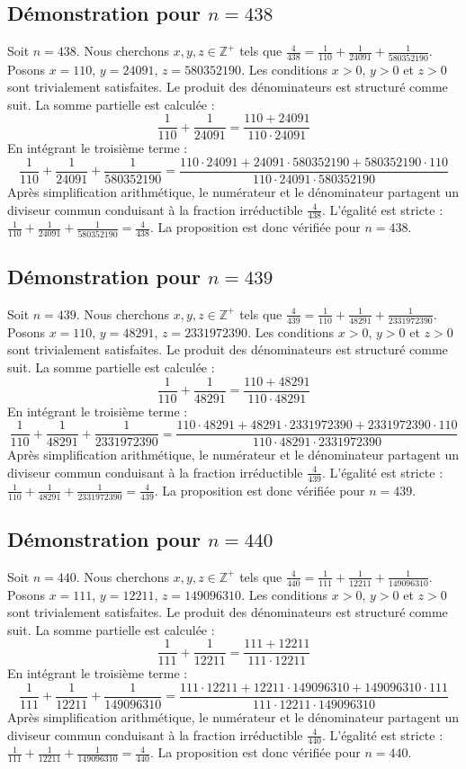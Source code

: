 \documentclass[11pt,a4paper]{article}
\begin{document}
\subsection{Démonstration pour $n = 438$}
Soit $n = 438$. Nous cherchons $x, y, z \in \mathbb{Z}^{+}$ tels que $\frac{4}{438} = \frac{1}{110} + \frac{1}{24091} + \frac{1}{580352190}$.
Posons $x = 110$, $y = 24091$, $z = 580352190$.
Les conditions $x > 0$, $y > 0$ et $z > 0$ sont trivialement satisfaites.
Le produit des dénominateurs est structuré comme suit. La somme partielle est calculée :
$$ \frac{1}{110} + \frac{1}{24091} = \frac{110+24091}{110 \cdot 24091} $$
En intégrant le troisième terme :
$$ \frac{1}{110} + \frac{1}{24091} + \frac{1}{580352190} = \frac{110 \cdot 24091 + 24091 \cdot 580352190 + 580352190 \cdot 110}{110 \cdot 24091 \cdot 580352190} $$
Après simplification arithmétique, le numérateur et le dénominateur partagent un diviseur commun conduisant à la fraction irréductible $\frac{4}{438}$.
L'égalité est stricte : $\frac{1}{110} + \frac{1}{24091} + \frac{1}{580352190} = \frac{4}{438}$.
La proposition est donc vérifiée pour $n = 438$.
\subsection{Démonstration pour $n = 439$}
Soit $n = 439$. Nous cherchons $x, y, z \in \mathbb{Z}^{+}$ tels que $\frac{4}{439} = \frac{1}{110} + \frac{1}{48291} + \frac{1}{2331972390}$.
Posons $x = 110$, $y = 48291$, $z = 2331972390$.
Les conditions $x > 0$, $y > 0$ et $z > 0$ sont trivialement satisfaites.
Le produit des dénominateurs est structuré comme suit. La somme partielle est calculée :
$$ \frac{1}{110} + \frac{1}{48291} = \frac{110+48291}{110 \cdot 48291} $$
En intégrant le troisième terme :
$$ \frac{1}{110} + \frac{1}{48291} + \frac{1}{2331972390} = \frac{110 \cdot 48291 + 48291 \cdot 2331972390 + 2331972390 \cdot 110}{110 \cdot 48291 \cdot 2331972390} $$
Après simplification arithmétique, le numérateur et le dénominateur partagent un diviseur commun conduisant à la fraction irréductible $\frac{4}{439}$.
L'égalité est stricte : $\frac{1}{110} + \frac{1}{48291} + \frac{1}{2331972390} = \frac{4}{439}$.
La proposition est donc vérifiée pour $n = 439$.
\subsection{Démonstration pour $n = 440$}
Soit $n = 440$. Nous cherchons $x, y, z \in \mathbb{Z}^{+}$ tels que $\frac{4}{440} = \frac{1}{111} + \frac{1}{12211} + \frac{1}{149096310}$.
Posons $x = 111$, $y = 12211$, $z = 149096310$.
Les conditions $x > 0$, $y > 0$ et $z > 0$ sont trivialement satisfaites.
Le produit des dénominateurs est structuré comme suit. La somme partielle est calculée :
$$ \frac{1}{111} + \frac{1}{12211} = \frac{111+12211}{111 \cdot 12211} $$
En intégrant le troisième terme :
$$ \frac{1}{111} + \frac{1}{12211} + \frac{1}{149096310} = \frac{111 \cdot 12211 + 12211 \cdot 149096310 + 149096310 \cdot 111}{111 \cdot 12211 \cdot 149096310} $$
Après simplification arithmétique, le numérateur et le dénominateur partagent un diviseur commun conduisant à la fraction irréductible $\frac{4}{440}$.
L'égalité est stricte : $\frac{1}{111} + \frac{1}{12211} + \frac{1}{149096310} = \frac{4}{440}$.
La proposition est donc vérifiée pour $n = 440$.
\end{document}

